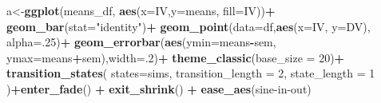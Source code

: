 \documentclass[
]{book}
\newenvironment{Shaded}{\begin{snugshade}}{\end{snugshade}}
\newcommand{\AttributeTok}[1]{\textcolor[rgb]{0.13,0.29,0.53}{#1}}
\newcommand{\DecValTok}[1]{\textcolor[rgb]{0.00,0.00,0.81}{#1}}
\newcommand{\FunctionTok}[1]{\textcolor[rgb]{0.13,0.29,0.53}{\textbf{#1}}}
\newcommand{\NormalTok}[1]{#1}
\newcommand{\OtherTok}[1]{\textcolor[rgb]{0.56,0.35,0.01}{#1}}
\newcommand{\SpecialCharTok}[1]{\textcolor[rgb]{0.81,0.36,0.00}{\textbf{#1}}}
\newcommand{\StringTok}[1]{\textcolor[rgb]{0.31,0.60,0.02}{#1}}
\begin{document}
\begin{Shaded}
\begin{Highlighting}[]
\NormalTok{a}\OtherTok{\textless{}{-}}\FunctionTok{ggplot}\NormalTok{(means\_df, }\FunctionTok{aes}\NormalTok{(}\AttributeTok{x=}\NormalTok{IV,}\AttributeTok{y=}\NormalTok{means, }\AttributeTok{fill=}\NormalTok{IV))}\SpecialCharTok{+}
  \FunctionTok{geom\_bar}\NormalTok{(}\AttributeTok{stat=}\StringTok{"identity"}\NormalTok{)}\SpecialCharTok{+}
  \FunctionTok{geom\_point}\NormalTok{(}\AttributeTok{data=}\NormalTok{df,}\FunctionTok{aes}\NormalTok{(}\AttributeTok{x=}\NormalTok{IV, }\AttributeTok{y=}\NormalTok{DV), }\AttributeTok{alpha=}\NormalTok{.}\DecValTok{25}\NormalTok{)}\SpecialCharTok{+}
  \FunctionTok{geom\_errorbar}\NormalTok{(}\FunctionTok{aes}\NormalTok{(}\AttributeTok{ymin=}\NormalTok{means}\SpecialCharTok{{-}}\NormalTok{sem, }\AttributeTok{ymax=}\NormalTok{means}\SpecialCharTok{+}\NormalTok{sem),}\AttributeTok{width=}\NormalTok{.}\DecValTok{2}\NormalTok{)}\SpecialCharTok{+}
  \FunctionTok{theme\_classic}\NormalTok{(}\AttributeTok{base\_size =} \DecValTok{20}\NormalTok{)}\SpecialCharTok{+}
  \FunctionTok{transition\_states}\NormalTok{(}
    \AttributeTok{states=}\NormalTok{sims,}
    \AttributeTok{transition\_length =} \DecValTok{2}\NormalTok{,}
    \AttributeTok{state\_length =} \DecValTok{1}
\NormalTok{  )}\SpecialCharTok{+}\FunctionTok{enter\_fade}\NormalTok{() }\SpecialCharTok{+} 
  \FunctionTok{exit\_shrink}\NormalTok{() }\SpecialCharTok{+}
  \FunctionTok{ease\_aes}\NormalTok{(}\StringTok{\textquotesingle{}sine{-}in{-}out\textquotesingle{}}\NormalTok{)}


\end{Highlighting}
\end{Shaded}
\end{document}
